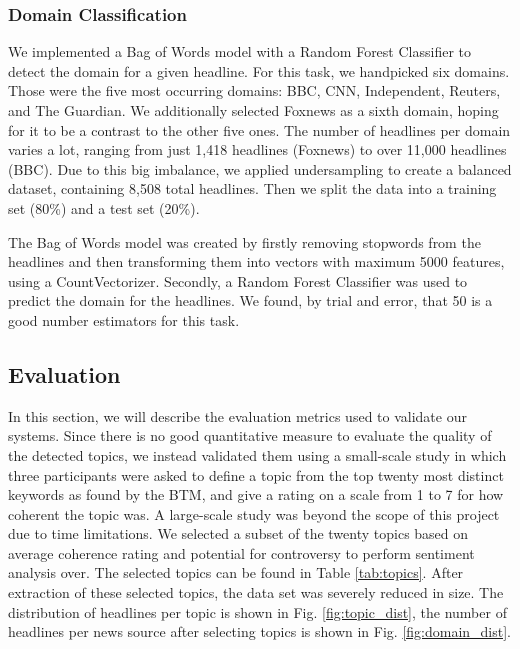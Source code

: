 \documentclass[final]{ieee}
\begin{document}
\subsubsection{Domain Classification}
We implemented a Bag of Words model with a Random Forest Classifier to detect the domain for a given headline. For this task, we handpicked six domains. Those were the five most occurring domains: BBC, CNN, Independent, Reuters, and The Guardian. We additionally selected Foxnews as a sixth domain, hoping for it to be a contrast to the other five ones. The number of headlines per domain varies a lot, ranging from just 1,418 headlines (Foxnews) to over 11,000 headlines (BBC). Due to this big imbalance, we applied undersampling to create a balanced dataset, containing 8,508 total headlines. Then we split the data into a training set (80\%) and a test set (20\%).

The Bag of Words model was created by firstly removing stopwords from the headlines and then transforming them into vectors with maximum 5000 features, using a CountVectorizer. Secondly, a Random Forest Classifier was used to predict the domain for the headlines. We found, by trial and error, that 50 is a good number estimators for this task.

\subsection{Evaluation}\label{sec:evaluation}

In this section, we will describe the evaluation metrics used to validate our systems. Since there is no good quantitative measure to evaluate the quality of the detected topics, we instead validated them using a small-scale study in which three participants were asked to define a topic from the top twenty most distinct keywords as found by the BTM, and give a rating on a scale from 1 to 7 for how coherent the topic was. A large-scale study was beyond the scope of this project due to time limitations. We selected a subset of the twenty topics based on average coherence rating and potential for controversy to perform sentiment analysis over. The selected topics can be found in Table \ref{tab:topics}. After extraction of these selected topics, the data set was severely reduced in size. The distribution of headlines per topic is shown in Fig. \ref{fig:topic_dist}, the number of headlines per news source after selecting topics is shown in Fig. \ref{fig:domain_dist}.
\end{document}
